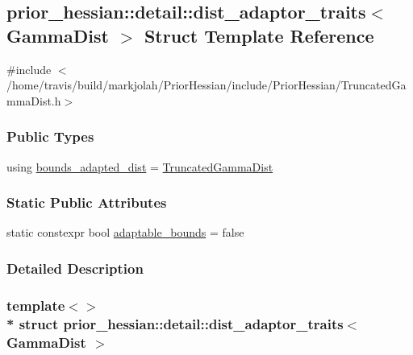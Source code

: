 \hypertarget{structprior__hessian_1_1detail_1_1dist__adaptor__traits_3_01GammaDist_01_4}{}\subsection{prior\+\_\+hessian\+:\+:detail\+:\+:dist\+\_\+adaptor\+\_\+traits$<$ Gamma\+Dist $>$ Struct Template Reference}
\label{structprior__hessian_1_1detail_1_1dist__adaptor__traits_3_01GammaDist_01_4}


{\ttfamily \#include $<$/home/travis/build/markjolah/\+Prior\+Hessian/include/\+Prior\+Hessian/\+Truncated\+Gamma\+Dist.\+h$>$}

\subsubsection*{Public Types}
\begin{DoxyCompactItemize}
\item 
using \hyperlink{structprior__hessian_1_1detail_1_1dist__adaptor__traits_3_01GammaDist_01_4_af6bc3262f73d0da5970cecd5b176ad22}{bounds\+\_\+adapted\+\_\+dist} = \hyperlink{namespaceprior__hessian_acd158ecf6698fbe5a4430df7730d3aba}{Truncated\+Gamma\+Dist}
\end{DoxyCompactItemize}
\subsubsection*{Static Public Attributes}
\begin{DoxyCompactItemize}
\item 
static constexpr bool \hyperlink{structprior__hessian_1_1detail_1_1dist__adaptor__traits_3_01GammaDist_01_4_a9e8a0bf94b105f8c0af7c3191178e9ed}{adaptable\+\_\+bounds} = false
\end{DoxyCompactItemize}


\subsubsection{Detailed Description}
\subsubsection*{template$<$$>$\\*
struct prior\+\_\+hessian\+::detail\+::dist\+\_\+adaptor\+\_\+traits$<$ Gamma\+Dist $>$}



